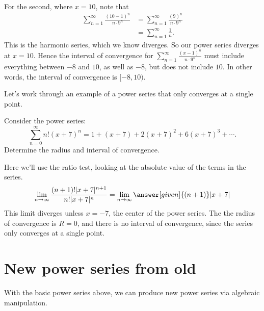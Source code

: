 \documentclass{ximera}
\begin{document}
\begin{example}
\begin{explanation}
    For the second, where $x=10$, note that
    \begin{align*}
      \sum_{n=1}^\infty \frac{(10-1)^n}{n \cdot 9^n} &= \sum_{n=1}^\infty \frac{(9)^n}{n \cdot 9^n}\\
      &= \sum_{n=1}^\infty \frac{1}{n}.
    \end{align*}
    This is the harmonic series, which we know diverges. So our
    power series diverges at $x= 10$. Hence the interval of
    convergence for $\sum_{n=1}^\infty \frac{(x-1)^n}{n \cdot 9^n}$ must include everything 
    between $-8$ and $10$, as well as $-8$, but does not include $10$.  In other words, the 
    interval of convergence is $[-8,10)$.
  \end{explanation}
\end{example}

Let's work through an example of a power series that only converges at a single
point.

\begin{example}
  Consider the power series:
  \[
  \sum_{n=0}^\infty n!(x+7)^n = 1 + (x+7) + 2(x+7)^2 + 6(x+7)^3 + \cdots.
  \]
  Determine the radius and interval of convergence.
  \begin{explanation}
    Here we'll use the ratio test, looking at the absolute value of
    the terms in the series.
    \[
    \lim_{n\to\infty} \frac{(n+1)!|x+7|^{n+1}}{n!|x+7|^n}= \lim_{n\to\infty} \answer[given]{(n+1)}|x+7|
    \]
    This limit diverges unless $x=-7$, the center of the power
    series. The the radius of convergence is $R=0$, and there is no
    interval of convergence, since the series only converges at a
    single point.
  \end{explanation}
\end{example}



\section{New power series from old}

With the basic power series above, we can produce new power series via
algebraic manipulation.
\end{document}
